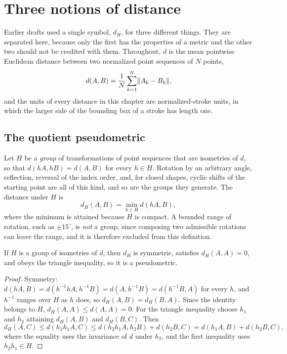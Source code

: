 \section{Three notions of distance}

Earlier drafts used a single symbol, $d_H$, for three different things. They are separated here, because only the first has the properties of a metric and the other two should not be credited with them. Throughout, $d$ is the mean pointwise Euclidean distance between two normalized point sequences of $N$ points,
\[
d(A,B)=\frac1N\sum_{k=1}^{N}\lVert A_k-B_k\rVert,
\]
and the units of every distance in this chapter are normalized-stroke units, in which the larger side of the bounding box of a stroke has length one.

\subsection*{The quotient pseudometric}

Let $H$ be a \emph{group} of transformations of point sequences that are isometries of $d$, so that $d(hA,hB)=d(A,B)$ for every $h\in H$. Rotation by an arbitrary angle, reflection, reversal of the index order, and, for closed shapes, cyclic shifts of the starting point are all of this kind, and so are the groups they generate. The distance under $H$ is
\[
d_H(A,B)=\min_{h\in H} d(hA,B),
\]
where the minimum is attained because $H$ is compact. A bounded range of rotation, such as $\pm15^\circ$, is \emph{not} a group, since composing two admissible rotations can leave the range, and it is therefore excluded from this definition.

\begin{proposition}\label{prop:pseudometric}
If $H$ is a group of isometries of $d$, then $d_H$ is symmetric, satisfies $d_H(A,A)=0$, and obeys the triangle inequality, so it is a pseudometric.
\end{proposition}
\begin{proof}
Symmetry: $d(hA,B)=d(h^{-1}hA,h^{-1}B)=d(A,h^{-1}B)=d(h^{-1}B,A)$ for every $h$, and $h^{-1}$ ranges over $H$ as $h$ does, so $d_H(A,B)=d_H(B,A)$. Since the identity belongs to $H$, $d_H(A,A)\le d(A,A)=0$. For the triangle inequality choose $h_1$ and $h_2$ attaining $d_H(A,B)$ and $d_H(B,C)$. Then
\[
d_H(A,C)\le d(h_2h_1A,C)\le d(h_2h_1A,h_2B)+d(h_2B,C)=d(h_1A,B)+d(h_2B,C),
\]
where the equality uses the invariance of $d$ under $h_2$, and the first inequality uses $h_2h_1\in H$. \qedhere
\end{proof}

